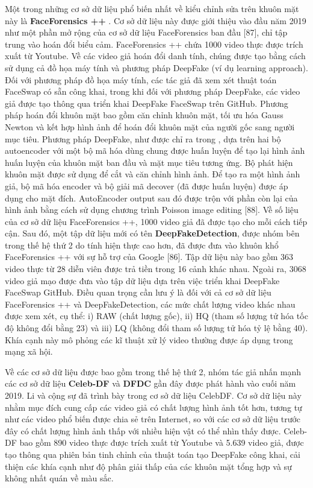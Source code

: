 \documentclass{article}
\begin{document}
Một trong những cơ sở dữ liệu phổ biến nhất về kiểu chỉnh sửa trên khuôn mặt này là \textbf{FaceForensics ++} . Cơ sở dữ liệu này được giới thiệu vào đầu năm 2019 như một phần mở rộng của cơ sở dữ liệu FaceForensics ban đầu [87], chỉ tập trung vào hoán đổi biểu cảm. FaceForensics ++ chứa 1000 video thực được trích xuất từ Youtube. Về các video giả hoán đổi danh tính, chúng được tạo bằng cách sử dụng cả đồ họa máy tính và phương pháp DeepFake (ví dụ learning approach). Đối với phương pháp đồ họa máy tính, các tác giả đã xem xét thuật toán FaceSwap có sẵn công khai, trong khi đối với phương pháp DeepFake, các video giả được tạo thông qua triển khai DeepFake FaceSwap trên GitHub. Phương pháp hoán đổi khuôn mặt bao gồm căn chỉnh khuôn mặt, tối ưu hóa Gauss Newton và kết hợp hình ảnh để hoán đổi khuôn mặt của người gốc sang người mục tiêu. Phương pháp DeepFake, như được chỉ ra trong , dựa trên hai bộ autoencoder với một bộ mã hóa dùng chung được huấn luyện để tạo lại hình ảnh huấn luyện của khuôn mặt ban đầu và mặt mục tiêu tương ứng. Bộ phát hiện khuôn mặt được sử dụng để cắt và căn chỉnh hình ảnh. Để tạo ra một hình ảnh giả, bộ mã hóa encoder và bộ giải mã decover (đã được huấn luyện) được áp dụng cho mặt đích. AutoEncoder output sau đó được trộn với phần còn lại của hình ảnh bằng cách sử dụng chương trình Poisson image editing [88]. Về số liệu của cơ sở dữ liệu FaceForensics ++, 1000 video giả đã được tạo cho mỗi cách tiếp cận. Sau đó, một tập dữ liệu mới có tên \textbf{DeepFakeDetection}, được nhóm bên trong thế hệ thứ 2 do tính hiện thực cao hơn, đã được đưa vào khuôn khổ FaceForensics ++ với sự hỗ trợ của Google [86]. Tập dữ liệu này bao gồm 363 video thực từ 28 diễn viên được trả tiền trong 16 cảnh khác nhau. Ngoài ra, 3068 video giả mạo được đưa vào tập dữ liệu dựa trên việc triển khai DeepFake FaceSwap GitHub. Điều quan trọng cần lưu ý là đối với cả cơ sở dữ liệu FaceForensics ++ và DeepFakeDetection, các mức chất lượng video khác nhau được xem xét, cụ thể: i) RAW (chất lượng gốc), ii) HQ (tham số lượng tử hóa tốc độ không đổi bằng 23) và iii) LQ (không đổi tham số lượng tử hóa tỷ lệ bằng 40). Khía cạnh này mô phỏng các kĩ thuật xử lý video thường được áp dụng trong mạng xã hội.

Về các cơ sở dữ liệu được bao gồm trong thế hệ thứ 2, nhóm tác giả nhấn mạnh các cơ sở dữ liệu \textbf{Celeb-DF} và \textbf{DFDC }gần đây được phát hành vào cuối năm 2019. Li và cộng sự đã trình bày trong  cơ sở dữ liệu CelebDF. Cơ sở dữ liệu này nhằm mục đích cung cấp các video giả có chất lượng hình ảnh tốt hơn, tương tự như các video phổ biến được chia sẻ trên Internet, so với các cơ sở dữ liệu trước đây có chất lượng hình ảnh thấp với nhiều hiện vật có thể nhìn thấy được. Celeb-DF bao gồm 890 video thực được trích xuất từ Youtube và 5.639 video giả, được tạo thông qua phiên bản tinh chỉnh của thuật toán tạo DeepFake công khai, cải thiện các khía cạnh như độ phân giải thấp của các khuôn mặt tổng hợp và sự không nhất quán về màu sắc.
\end{document}
